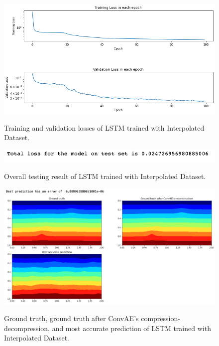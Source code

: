 \begin{figure}[H]
    \caption{Training and validation losses of LSTM trained with Interpolated Dataset.}
    \includegraphics[scale=0.6]{figures/mantle_convection_images/larger_dataset_interpolated/LSTM_trainingData.png}
    \label{figure:LSTM_interpolated_losses}
\end{figure}

\begin{figure}[H]
    \caption{Overall testing result of LSTM trained with Interpolated Dataset.}
    \includegraphics[scale=0.8]{figures/mantle_convection_images/larger_dataset_interpolated/LSTM_OverallTesting.png}
    \label{figure:LSTM_interpolated_testing}
\end{figure}

\begin{figure}[H]
    \caption{Ground truth, ground truth after ConvAE's compression-decompression, and most accurate prediction of LSTM trained with Interpolated Dataset.}
    \includegraphics[scale=0.5]{figures/mantle_convection_images/larger_dataset_interpolated/LSTM_Best.png}
    \label{figure:LSTM_interpolated_best}
\end{figure}

